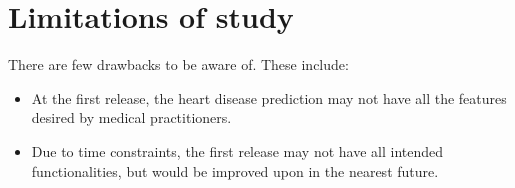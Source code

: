 \section{Limitations of study}
There are few drawbacks to be aware of. These include:
\begin{itemize}
	\item{At the first release, the heart disease prediction may not have all the features desired by medical practitioners.}
	\item{Due to time constraints, the first release may not have all intended functionalities, but would be improved upon in the nearest future.}
\end{itemize}